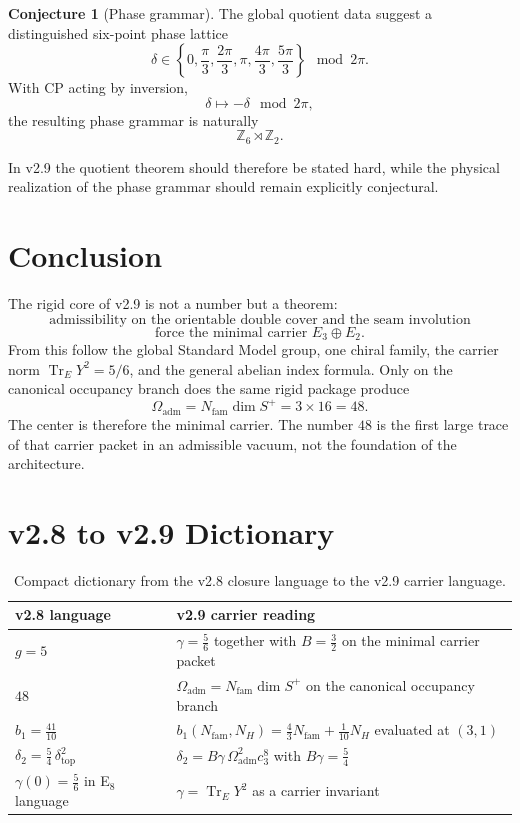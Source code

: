 \documentclass[11pt,a4paper]{article}
\theoremstyle{definition}
\newtheorem{conjecture}[theorem]{Conjecture}
\theoremstyle{remark}
\newcommand{\cthree}{c_3}
\newcommand{\deltatop}{\delta_{\mathrm{top}}}
\newcommand{\bone}{b_1}
\newcommand{\tr}{\operatorname{Tr}}
\newcommand{\Oadm}{\Omega_{\mathrm{adm}}}
\begin{document}
\begin{conjecture}[Phase grammar]
The global quotient data suggest a distinguished six-point phase lattice
\[
\delta \in \left\{
0,\frac{\pi}{3},\frac{2\pi}{3},\pi,\frac{4\pi}{3},\frac{5\pi}{3}
\right\}\mod 2\pi.
\]
With CP acting by inversion,
\[
\delta \mapsto -\delta \mod 2\pi,
\]
the resulting phase grammar is naturally
\[
\mathbb Z_6\rtimes \mathbb Z_2.
\]
\end{conjecture}

In v2.9 the quotient theorem should therefore be stated hard, while the physical realization of the phase grammar should remain explicitly conjectural.

\section{Conclusion}

The rigid core of v2.9 is not a number but a theorem:
\[
\boxed{
\text{admissibility on the orientable double cover and the seam involution}
}
\]
\[
\boxed{
\text{force the minimal carrier }E_3\oplus E_2.
}
\]
From this follow the global Standard Model group, one chiral family, the carrier norm $\tr_EY^2=5/6$, and the general abelian index formula. Only on the canonical occupancy branch does the same rigid package produce
\[
\Oadm = N_{\mathrm{fam}}\dim S^+ = 3\times 16 = 48.
\]
The center is therefore the minimal carrier. The number $48$ is the first large trace of that carrier packet in an admissible vacuum, not the foundation of the architecture.

\appendix

\section{v2.8 to v2.9 Dictionary}

\begin{table}[H]
\centering
\small
\begin{tabularx}{\linewidth}{@{}lX@{}}
\toprule
v2.8 language & v2.9 carrier reading \\
\midrule
$g=5$ & $\gamma=\frac56$ together with $B=\frac32$ on the minimal carrier packet \\
$48$ & $\Oadm=N_{\mathrm{fam}}\dim S^+$ on the canonical occupancy branch \\
$\bone=\frac{41}{10}$ & $\bone(N_{\mathrm{fam}},N_H)=\frac43 N_{\mathrm{fam}}+\frac1{10}N_H$ evaluated at $(3,1)$ \\
$\delta_2=\frac54\,\deltatop^2$ & $\delta_2 = B\gamma\,\Oadm^2\cthree^8$ with $B\gamma=\frac54$ \\
$\gamma(0)=\frac56$ in E$_8$ language & $\gamma=\tr_EY^2$ as a carrier invariant \\
\bottomrule
\end{tabularx}
\caption{Compact dictionary from the v2.8 closure language to the v2.9 carrier language.}
\end{table}
\end{document}
